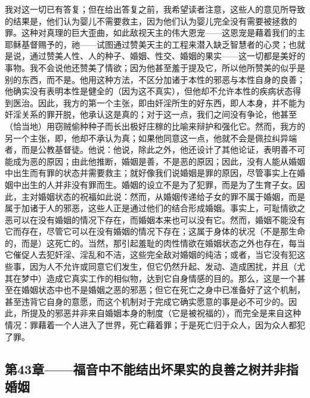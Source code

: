 我对这一切已有答复；但在给出答复之前，我希望读者注意，这些人的意见所导致的结果是，他们认为婴儿不需要救主，因为他们认为婴儿完全没有需要被拯救的罪。这种对真理的巨大歪曲，如此敌视天主的伟大恩宠——这恩宠是藉着我们的主耶稣基督赐予的，祂——试图通过赞美天主的工程来潜入缺乏智慧者的心灵；也就是说，通过赞美人性、人的种子、婚姻、性交、婚姻的果实——这一切都是美好的事物。我不会说他还赞美了情欲；因为他甚至羞于提及它，所以他所赞美的似乎是别的东西，而不是。他用这种方法，不区分加诸于本性的邪恶与本性自身的良善；他确实没有表明本性是健全的（因为这不真实），但他却不允许本性的疾病状态得到医治。因此，我方的第一个主张，即由奸淫所生的好东西，即人本身，并不能为奸淫关系的罪开脱，他承认这是真的；对于这一点，我们之间没有争论，他甚至（恰当地）用窃贼偷种种子而长出极好庄稼的比喻来辩护和强化它。然而，我方的另一个主张，即，他却不承认为真；如果他同意这一点，他就不会是佩拉纠异端者，而是公教基督徒。他说：他说，除此之外，他还设计了其他论证，表明善不可能成为恶的原因；由此他推断，婚姻是善，不是恶的原因；因此，没有人能从婚姻中出生而有罪的状态并需要救主；就好像我们说婚姻是罪的原因，尽管事实上在婚姻中出生的人并非没有罪而生。婚姻的设立不是为了犯罪，而是为了生育子女。因此，主对婚姻状态的祝福如此说：然而，从婚姻传递给子女的罪不属于婚姻，而是属于加诸于人的邪恶，这些人正是通过他们的结合形成婚姻。事实上，可耻情欲之恶可以在没有婚姻的情况下存在，而婚姻本来也可以没有它。然而，婚姻不能没有它而存在，尽管它可以在没有婚姻的情况下存在；这属于身体的状况（不是那生命的，而是）这死亡的。当然，那引起羞耻的肉性情欲在婚姻状态之外也存在，每当它催促人去犯奸淫、淫乱和不洁，这些完全敌对婚姻的纯洁；或者，当它没有犯这些事，因为人不允许或同意它们发生，但它仍然升起、发动、造成困扰，并且（尤其在梦中）造成它真实工作的相似物，达到它自身情感的目的。那么，这是一个甚至在婚姻状态中也不是婚姻之恶的邪恶；但它在死亡之身中已准备好了这个机制，甚至违背它自身的意愿，而这个机制对于完成它确实愿意的事是必不可少的。因此，所提及的邪恶并非来自婚姻本身的制度（它是被祝福的），而完全是来自这种情况：罪藉着一个人进入了世界，死亡藉着罪；于是死亡归于众人，因为众人都犯了罪。\par


\subsection{第43章——福音中不能结出坏果实的良善之树并非指婚姻}

